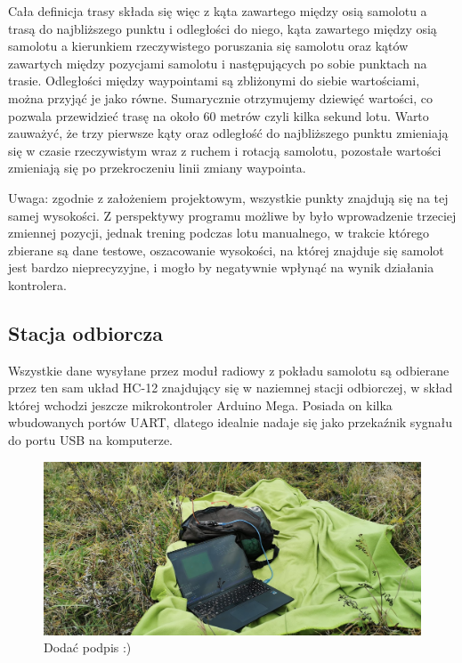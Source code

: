 \documentclass[12pt, a4paper]{article}
\begin{document}
Cała definicja trasy składa się więc z kąta zawartego między osią samolotu a trasą do najbliższego punktu i odległości do niego, kąta zawartego między osią samolotu a kierunkiem rzeczywistego poruszania się samolotu oraz kątów zawartych między pozycjami samolotu i następujących po sobie punktach na trasie. Odległości między waypointami są zbliżonymi do siebie wartościami, można przyjąć je jako równe. Sumarycznie otrzymujemy dziewięć wartości, co pozwala przewidzieć trasę na około 60 metrów czyli kilka sekund lotu. Warto zauważyć, że trzy pierwsze kąty oraz odległość do najbliższego punktu zmieniają się w czasie rzeczywistym wraz z ruchem i rotacją samolotu, pozostałe wartości zmieniają się po przekroczeniu linii zmiany waypointa. 

Uwaga: zgodnie z założeniem projektowym, wszystkie punkty znajdują się na tej samej wysokości. Z perspektywy programu możliwe by było wprowadzenie trzeciej zmiennej pozycji, jednak trening podczas lotu manualnego, w trakcie którego zbierane są dane testowe, oszacowanie wysokości, na której znajduje się samolot jest bardzo nieprecyzyjne, i mogło by negatywnie wpłynąć na wynik działania kontrolera.



 \FloatBarrier
\subsection{Stacja odbiorcza}
Wszystkie dane wysyłane przez moduł radiowy z pokładu samolotu są odbierane przez ten sam układ HC-12 znajdujący się w naziemnej stacji odbiorczej, w skład której wchodzi jeszcze mikrokontroler Arduino Mega. Posiada on kilka wbudowanych portów UART, dlatego idealnie nadaje się jako przekaźnik sygnału do portu USB na komputerze.
 \begin{figure}[ht]
    \centering
    \includegraphics[width=1\textwidth]{stacjaodbiorcza}
    \caption{Dodać podpis :)}
\end{figure}
\end{document}
